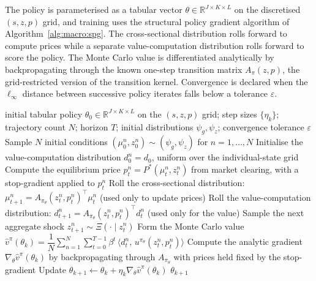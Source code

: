 The policy is parameterised as a tabular vector
$\theta \in \mathbb R^{J \times K \times L}$ on the discretised
$(s, z, p)$ grid, and training uses the structural policy gradient
algorithm of Algorithm~\ref{alg:macro:spg}. The cross-sectional
distribution rolls forward to compute prices while a separate
value-computation distribution rolls forward to score the policy.
The Monte Carlo value is differentiated analytically by
backpropagating through the known one-step transition matrix
$A_\pi(z, p)$, the grid-restricted version of the transition kernel.
Convergence is declared when the $\ell_\infty$ distance between
successive policy iterates falls below a tolerance $\varepsilon$.

\begin{algorithm}[t]
\caption{Structural Policy Gradient (SPG) for HA macro models}
\label{alg:macro:spg}
\begin{algorithmic}[1]
\Require initial tabular policy $\theta_0 \in \mathbb{R}^{J \times K \times L}$ on the $(s, z, p)$ grid; step sizes $\{\eta_k\}$; trajectory count $N$; horizon $T$; initial distributions $\psi_g, \psi_z$; convergence tolerance $\varepsilon$
  \State Sample $N$ initial conditions $(\mu^n_0, z^n_0) \sim (\psi_g, \psi_z)$ for $n = 1, \ldots, N$
  \State Initialise the value-computation distribution $d^n_0 = d_0$, uniform over the individual-state grid
      \State Compute the equilibrium price $p^n_t = P^*(\mu^n_t, z^n_t)$ from market clearing, with a stop-gradient applied to $p^n_t$
      \State Roll the cross-sectional distribution: $\mu^n_{t+1} = A_{\pi_\theta}(z^n_t, p^n_t)^\top \mu^n_t$ (used only to update prices)
      \State Roll the value-computation distribution: $d^n_{t+1} = A_{\pi_\theta}(z^n_t, p^n_t)^\top d^n_t$ (used only for the value)
      \State Sample the next aggregate shock $z^n_{t+1} \sim \Xi(\cdot \mid z^n_t)$
    \EndFor
  \EndFor
  \State Form the Monte Carlo value $\widehat{v}^{\pi}(\theta_k) = \dfrac{1}{N}\sum_{n=1}^N \sum_{t=0}^{T-1} \beta^t \,\bigl\langle d^n_t,\, u^{\pi_\theta}(z^n_t, p^n_t)\bigr\rangle$
  \State Compute the analytic gradient $\nabla_\theta \widehat{v}^{\pi}(\theta_k)$ by backpropagating through $A_{\pi_\theta}$ with prices held fixed by the stop-gradient
  \State Update $\theta_{k+1} \leftarrow \theta_k + \eta_k \nabla_\theta \widehat{v}^{\pi}(\theta_k)$
    \State \Return $\theta_{k+1}$
  \EndIf
\EndFor
\end{algorithmic}
\end{algorithm}

